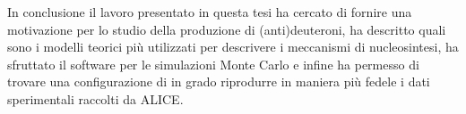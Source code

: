 In conclusione il lavoro presentato in questa tesi ha cercato di fornire una motivazione per lo studio della produzione di (anti)deuteroni, ha descritto quali sono i modelli teorici più utilizzati per descrivere i meccanismi di nucleosintesi, ha sfruttato il software \pythiaa{} per le simulazioni Monte Carlo e infine ha permesso di trovare una configurazione di \pythiaa{} in grado riprodurre in maniera più fedele i dati sperimentali raccolti da ALICE.